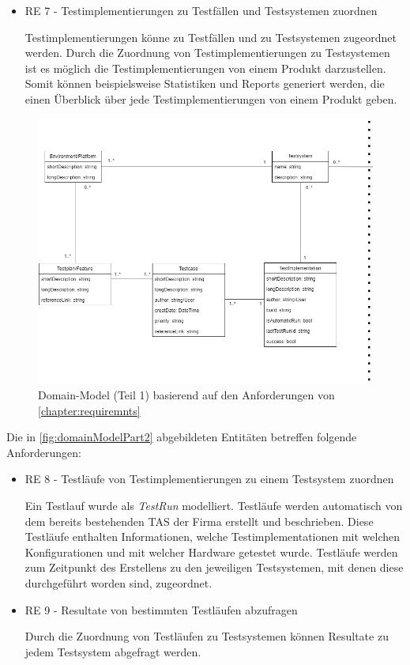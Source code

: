 \documentclass[a4paper, fontsize=11pt, parskip=half, twoside]{scrreprt}
\begin{document}
\begin{itemize}
		\item RE 7 - Testimplementierungen zu Testfällen und Testsystemen zuordnen
		
		Testimplementierungen könne zu Testfällen und zu Testsystemen zugeordnet werden.
		Durch die Zuordnung von Testimplementierungen zu Testsystemen ist es möglich die Testimplementierungen von einem Produkt darzustellen.
		Somit können beispielsweise Statistiken und Reports generiert werden, die einen Überblick über jede Testimplementierungen von einem Produkt geben.
	\end{itemize}

	\begin{figure}[ht]
		\centering
		\includegraphics[scale=0.6]{assets/TCMS_DomainModel_part1.png}
		\caption{Domain-Model (Teil 1) basierend auf den Anforderungen von \autoref{chapter:requiremnts}}
		\label{fig:domainModelPart1}
	\end{figure}

	Die in \autoref{fig:domainModelPart2} abgebildeten Entitäten betreffen folgende Anforderungen:
	
	\begin{itemize}
		\item RE 8 - Testläufe von Testimplementierungen zu einem Testsystem zuordnen
		
		Ein Testlauf wurde als \emph{TestRun} modelliert.
		Testläufe werden automatisch von dem bereits bestehenden \ac{TAS} der Firma erstellt und beschrieben.
		Diese Testläufe enthalten Informationen, welche Testimplementationen mit welchen Konfigurationen und mit welcher Hardware getestet wurde.
		Testläufe werden zum Zeitpunkt des Erstellens zu den jeweiligen Testsystemen, mit denen diese durchgeführt worden sind, zugeordnet.
		
		\item RE 9 - Resultate von bestimmten Testläufen abzufragen
		
		Durch die Zuordnung von Testläufen zu Testsystemen können Resultate zu jedem Testsystem abgefragt werden.
	\end{itemize}
\end{document}
